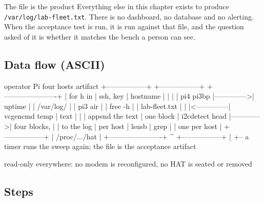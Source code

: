 \begin{note}{The file is the product}
Everything else in this chapter exists to produce \texttt{/var/log/lab-fleet.txt}. There is no dashboard, no database and no alerting. When the acceptance test is run, it is run against that file, and the question asked of it is whether it matches the bench a person can see.
\end{note}

\subsection*{Data flow (ASCII)}

\begin{asciiart}
  operator Pi                       four hosts                      artifact
  +-----------------+               +-----------------+             +----------------------+
  | for h in        |  ssh, key     | hostname        |             |                      |
  |   pi4 pi3bp     |-------------->| uptime          |             | /var/log/            |
  |   pi3 air       |               | free -h         |             |   lab-fleet.txt      |
  |                 |<--------------| vcgencmd temp   |  text       |                      |
  | append the text |   one block   | i2cdetect head  |------------>| four blocks,         |
  | to the log      |   per host    | lsusb | grep    |             | one per host         |
  +-----------------+               | /proc/.../hat   |             +----------------------+
         ^                          +-----------------+
         |
         +-- a timer runs the sweep again; the file is the acceptance artifact

  read-only everywhere: no modem is reconfigured, no HAT is seated or removed
\end{asciiart}

\subsection*{Steps}

